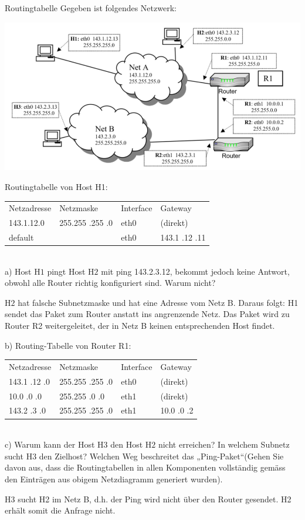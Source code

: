 \begin{example2}{Routingtabelle}
  Gegeben ist folgendes Netzwerk:

  \includegraphics[width=0.8\linewidth]{images/bsp_routing.png}

  Routingtabelle von Host H1:

  \begin{tabular}{llll} 
    Netzadresse & Netzmaske & Interface & Gateway \\
    143.1.12.0 & 255.255 .255 .0 & eth0 & (direkt) \\
    default & & eth0 & 143.1 .12 .11
    \end{tabular}\\

    a) Host $\mathrm{H} 1$ pingt Host $\mathrm{H} 2$ mit ping 143.2.3.12, bekommt jedoch keine Antwort, obwohl alle Router richtig konfiguriert sind. Warum nicht? 

$\mathrm{H} 2$ hat falsche Subnetzmaske und hat eine Adresse vom Netz B.
Daraus folgt: H1 sendet das Paket zum Router anstatt ins angrenzende Netz.
Das Paket wird zu Router R2 weitergeleitet, der in Netz B keinen entsprechenden Host findet.

b) Routing-Tabelle von Router R1:

\begin{tabular}{llll} 
Netzadresse & Netzmaske & Interface & Gateway \\
143.1 .12 .0 & 255.255 .255 .0 & eth0 & (direkt) \\
10.0 .0 .0 & 255.255 .0 .0 & eth1 & (direkt) \\
143.2 .3 .0 & 255.255 .255 .0 & eth1 & 10.0 .0 .2
\end{tabular}\\

c) Warum kann der Host $\mathrm{H} 3$ den Host $\mathrm{H} 2$ nicht erreichen? In welchem Subnetz sucht $\mathrm{H} 3$ den Zielhost? Welchen Weg beschreitet das „Ping-Paket“(Gehen Sie davon aus, dass die Routingtabellen in allen Komponenten vollständig gemäss den Einträgen aus obigem Netzdiagramm generiert wurden).

$\mathrm{H} 3$ sucht H2 im Netz B, d.h. der Ping wird nicht über den Router gesendet. H2 erhält somit die Anfrage nicht.
\end{example2}

